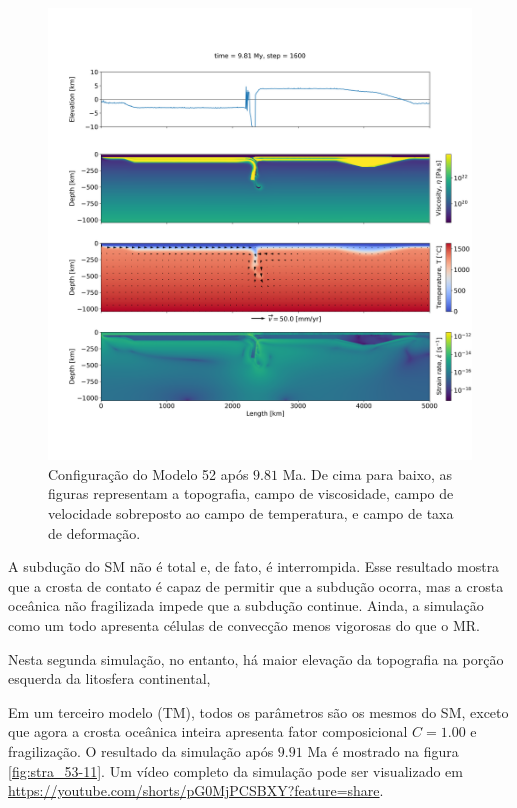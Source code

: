 \begin{figure}
    \centering
    \includegraphics[trim={1.5cm 3.5cm 0.0cm 4cm}, clip, width=1.0 \textwidth]{fig/strak_52-11.png}
    \caption{Configuração do Modelo 52 após $9.81$ Ma. De cima para baixo, as figuras representam a topografia, campo de viscosidade, campo de velocidade sobreposto ao campo de temperatura, e campo de taxa de deformação.}
    \label{fig:stra_52-11}
\end{figure}

A subdução do SM não é total e, de fato, é interrompida. Esse resultado mostra que a crosta de contato é capaz de permitir que a subdução ocorra, mas a crosta oceânica não fragilizada impede que a subdução continue. Ainda, a simulação como um todo apresenta células de convecção menos vigorosas do que o MR.

Nesta segunda simulação, no entanto, há maior elevação da topografia na porção esquerda da litosfera continental, 


Em um terceiro modelo (TM), todos os parâmetros são os mesmos do SM, exceto que agora a crosta oceânica inteira apresenta fator composicional $C=1.00$ e fragilização. O resultado da simulação após $9.91$ Ma é mostrado na figura \ref{fig:stra_53-11}. Um vídeo completo da simulação pode ser visualizado em \url{https://youtube.com/shorts/pG0MjPCSBXY?feature=share}.

